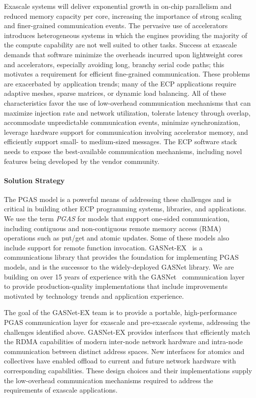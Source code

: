 Exascale systems will deliver exponential growth in on-chip parallelism and
reduced memory capacity per core, 
increasing the importance of strong
scaling and finer-grained communication events.  
The pervasive use of accelerators introduces heterogeneous systems in which
the engines providing the majority of the compute capability are not well
suited to other tasks.
Success at exascale demands that
software minimize the overheads incurred upon lightweight cores and accelerators,
especially avoiding long, branchy serial code paths; 
this motivates a requirement for efficient
fine-grained communication.
These problems are exacerbated by application trends; many of the ECP applications require
adaptive meshes, sparse matrices,
or dynamic load balancing.
All of these characteristics favor the use of
low-overhead communication mechanisms that
can maximize injection rate and network utilization, tolerate latency through
overlap, accommodate unpredictable communication events, minimize synchronization,
leverage hardware support for communication involving accelerator memory,
and efficiently support small- to medium-sized messages. The ECP software stack
needs to expose the best-available communication mechanisms, including novel
features being developed by the vendor community.

\paragraph{Solution Strategy}

The PGAS model is a powerful means of addressing these
challenges and is critical in building other ECP programming systems,
libraries, and applications.  We use the term {\em PGAS} for models that support
one-sided communication, 
including contiguous and non-contiguous remote memory access (RMA) operations such as put/get
and atomic updates. Some of these models also include support for remote function invocation.
GASNet-EX~\cite{gasnet-lcpc18} is a communications library that provides the foundation for implementing
PGAS models, and is the successor to the widely-deployed GASNet library.
We are building on over 15 years of experience with the GASNet~\cite{gasnet-site,gasnet-spec}
communication layer to provide production-quality implementations that include
improvements motivated by
technology trends and application experience.  

The goal of the GASNet-EX team is to provide a portable, high-performance PGAS
communication layer for exascale and pre-exascale systems, addressing the challenges
identified above.
GASNet-EX provides interfaces that efficiently match the RDMA capabilities of modern
inter-node network hardware and intra-node communication between distinct address spaces.
New interfaces for atomics and collectives have enabled offload to current
and future network hardware with corresponding capabilities.
These design choices and their implementations supply the low-overhead communication
mechanisms required to address the requirements of exascale applications.

